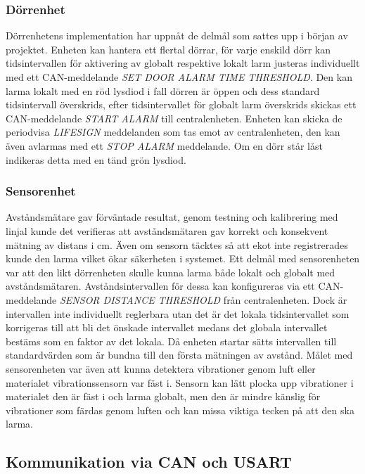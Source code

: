 \documentclass{article}
\begin{document}
\subsubsection{Dörrenhet}
Dörrenhetens implementation har uppnåt de delmål som sattes upp i början av projektet. 
Enheten kan hantera ett flertal dörrar, för varje enskild dörr kan tidsintervallen för aktivering av globalt respektive lokalt larm justeras individuellt med ett CAN-meddelande \emph{SET DOOR ALARM TIME THRESHOLD}. 
Den kan larma lokalt med en röd lysdiod i fall dörren är öppen och dess standard tidsintervall överskrids, efter tidsintervallet för globalt larm överskrids skickas ett CAN-meddelande \emph{START ALARM} till centralenheten.
Enheten kan skicka de periodvisa \emph{LIFESIGN} meddelanden som tas emot av centralenheten, den kan även avlarmas med ett \emph{STOP ALARM} meddelande. Om en dörr står låst indikeras detta med en tänd grön lysdiod.

\subsubsection{Sensorenhet}
Avståndsmätare gav förväntade resultat, genom testning och kalibrering med linjal kunde det verifieras att avståndsmätaren gav korrekt och konsekvent mätning av distans i cm.
Även om sensorn täcktes så att ekot inte registrerades kunde den larma vilket ökar säkerheten i systemet. 
Ett delmål med sensorenheten var att den likt dörrenheten skulle kunna larma både lokalt och globalt med avståndsmätaren. 
Avståndsintervallen för dessa kan konfigureras via ett CAN-meddelande \emph{SENSOR DISTANCE THRESHOLD} från centralenheten. 
Dock är intervallen inte individuellt reglerbara utan det är det lokala tidsintervallet som korrigeras till att bli det önskade intervallet medans det globala intervallet bestäms som en faktor av det lokala. 
Då enheten startar sätts intervallen till standardvärden som är bundna till den första mätningen av avstånd. Målet med sensorenheten var även att kunna detektera vibrationer genom luft eller materialet vibrationssensorn var fäst i. Sensorn kan lätt plocka upp vibrationer i materialet den är fäst i och larma globalt, men den är mindre känslig för vibrationer som färdas genom luften och kan missa viktiga tecken på att den ska larma.

\subsection{Kommunikation via CAN och USART}
\end{document}
